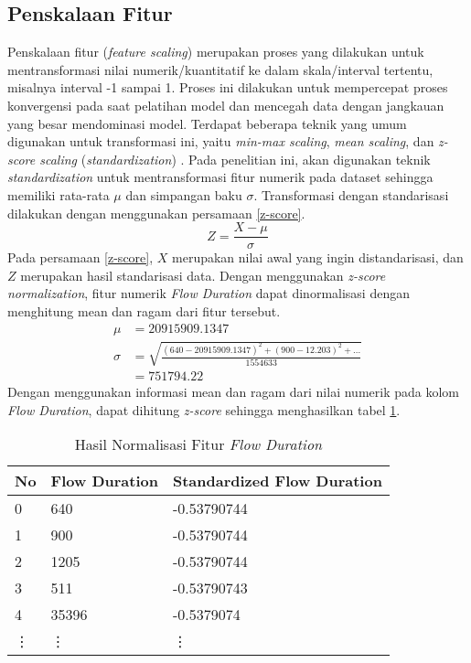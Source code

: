 \documentclass[a4paper,12pt]{report}
\begin{document}
\subsection{Penskalaan Fitur}
Penskalaan fitur (\textit{feature scaling}) merupakan proses yang dilakukan untuk mentransformasi nilai numerik/kuantitatif ke dalam skala/interval tertentu, misalnya interval -1 sampai 1. Proses ini dilakukan untuk mempercepat proses konvergensi pada saat pelatihan model dan mencegah data dengan jangkauan yang besar mendominasi model. Terdapat beberapa teknik yang umum digunakan untuk transformasi ini, yaitu \textit{min-max scaling}, \textit{mean scaling}, dan \textit{z-score scaling} (\textit{standardization}) \cite{pajankarHandsonMachineLearning2022}. Pada penelitian ini, akan digunakan teknik \textit{standardization} untuk mentransformasi fitur numerik pada dataset sehingga memiliki rata-rata $\mu$ dan simpangan baku $\sigma$. Transformasi dengan standarisasi dilakukan dengan menggunakan persamaan \ref{z-score}.
\begin{equation}
	Z = \frac{X-\mu}{\sigma}
	\label{z-score}
\end{equation}
Pada persamaan \ref{z-score}, $X$ merupakan nilai awal yang ingin distandarisasi, dan $Z$ merupakan hasil standarisasi data. Dengan menggunakan \textit{z-score normalization}, fitur numerik \textit{Flow Duration} dapat dinormalisasi dengan menghitung mean dan ragam dari fitur tersebut.
\begin{equation}
	\begin{split}
		\mu &= 20915909.1347 \\
		\sigma &= \sqrt{\frac{(640-20915909.1347)^2 + (900-12.203)^2 + ...}{1554633}} \\
		&= 751794.22
	\end{split}
\end{equation}  
Dengan menggunakan informasi mean dan ragam dari nilai numerik pada kolom \textit{Flow Duration}, dapat dihitung \textit{z-score} sehingga menghasilkan tabel \ref{tabelNorm}.

 \begin{longtable}{|l|l|l|}
	\caption{Hasil Normalisasi Fitur \textit{Flow Duration}} \label{tabelNorm}\\
	\hline
	No & Flow Duration & Standardized Flow Duration \\ \hline
	0 & 640 & -0.53790744 \\ \hline
	1 & 900 & -0.53790744 \\ \hline
	2 & 1205 & -0.53790744 \\ \hline
	3 & 511	 & -0.53790743 \\ \hline
	4 & 35396 & -0.5379074 \\ \hline
	\vdots & \vdots & \vdots \\ \hline
\end{longtable}
\end{document}
